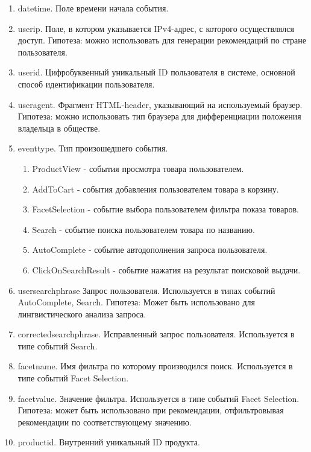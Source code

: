 \documentclass[14pt]{mmcs_article}
\newenvironment{myenumerate}
{ \begin{enumerate}
		\setlength{\itemsep}{0pt}
		\setlength{\parskip}{0pt}
		\setlength{\parsep}{0pt}     }
	{ \end{enumerate}                  }
\begin{document}
\begin{myenumerate}
	\item datetime. Поле времени начала события. 
	\item userip. Поле, в котором указывается IPv4-адрес, с которого осуществлялся доступ. Гипотеза: можно использовать для генерации рекомендаций по стране пользователя.
	\item userid. Цифробуквенный уникальный ID пользователя в системе, основной способ идентификации пользователя.
	\item useragent. Фрагмент HTML-header, указывающий на используемый браузер. Гипотеза: можно использовать тип браузера для дифференциации положения владельца в обществе.
	\item eventtype. Тип произошедшего события. 
	\begin{myenumerate}
		\item ProductView - события просмотра товара пользователем. 
		\item AddToCart - события добавления пользователем товара в корзину. 
		\item FacetSelection - событие выбора пользователем фильтра показа товаров.  
		\item Search - событие поиска пользователем товара по названию.
		\item AutoComplete - событие автодополнения запроса пользователя. 
		\item ClickOnSearchResult - событие нажатия на результат поисковой выдачи. 
	\end{myenumerate}
	\item usersearchphrase Запрос пользователя. Используется в типах событий AutoComplete, Search. Гипотеза: Может быть использовано для лингвистического анализа запроса.
	\item correctedsearchphrase. Исправленный запрос пользователя. Используется в типе событий Search. 
	\item facetname. Имя фильтра по которому производился поиск. Используется в типе событий Facet Selection. 
	\item facetvalue. Значение фильтра. Используется в типе событий Facet Selection. Гипотеза: может быть использовано при рекомендации, отфильтровывая рекомендации по соответствующему значению. 
	\item productid. Внутренний уникальный ID продукта. 
\end{myenumerate}
\end{document}
